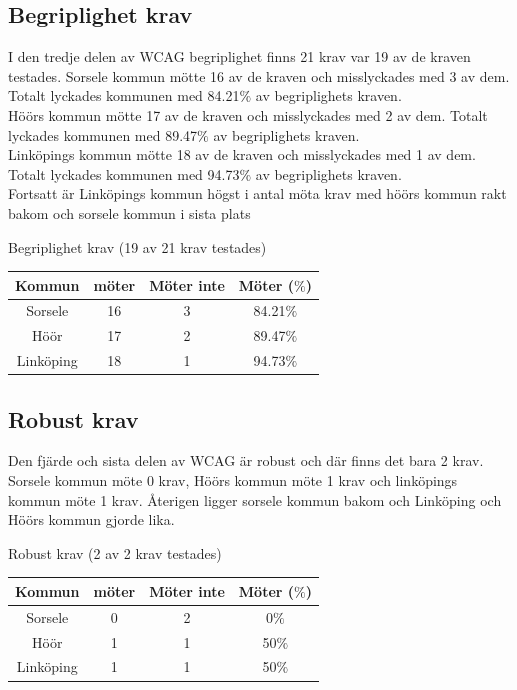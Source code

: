 \documentclass[11p]{article}
\begin{document}
    \subsection{Begriplighet krav}
    I den tredje delen av WCAG begriplighet finns 21 krav var 19 av de kraven testades.
    Sorsele kommun mötte 16 av de kraven och misslyckades med 3 av dem.
    Totalt lyckades kommunen med 84.21$\%$ av begriplighets kraven.
    \\Höörs kommun mötte 17 av de kraven och misslyckades med 2 av dem.
    Totalt lyckades kommunen med 89.47$\%$ av begriplighets kraven.
    \\Linköpings kommun mötte 18 av de kraven och misslyckades med 1 av dem.
    Totalt lyckades kommunen med 94.73$\%$ av begriplighets kraven.
    \\Fortsatt är Linköpings kommun högst i antal möta krav med höörs kommun rakt bakom och sorsele kommun i sista plats

    \begin{center}
    Begriplighet krav (19 av 21 krav testades)

    \begin{tabular}{ |c|c|c|c|}
        \hline
        Kommun & möter & Möter inte & Möter ($\%$) \\  \hline
        Sorsele & 16 & 3 & 84.21$\%$ \\ \hline
        Höör & 17 & 2 & 89.47$\%$ \\ \hline
        Linköping & 18 & 1 & 94.73$\%$ \\ \hline
    \end{tabular}
    \end{center}

    \subsection{Robust krav}
    Den fjärde och sista delen av WCAG är robust och där finns det bara 2 krav.
    Sorsele kommun möte 0 krav, Höörs kommun möte 1 krav och linköpings kommun möte 1 krav.
    Återigen ligger sorsele kommun bakom och Linköping och Höörs kommun gjorde lika.

    \begin{center}
    Robust krav (2 av 2 krav testades)

    \begin{tabular}{ |c|c|c|c|}
        \hline
        Kommun & möter & Möter inte & Möter ($\%$) \\  \hline
        Sorsele & 0 & 2 & 0$\%$ \\ \hline
        Höör & 1 & 1 & 50$\%$ \\ \hline
        Linköping & 1 & 1 & 50$\%$ \\ \hline
    \end{tabular}
    \end{center}
    
\end{document}
